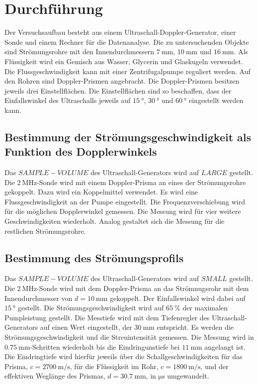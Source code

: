 \section{Durchführung}
\label{sec:Durchführung}
Der Versuchsaufbau besteht aus einem Ultraschall-Doppler-Generator, einer Sonde und einem Rechner für die Datenanalyse.
Die zu untersuchenden Objekte sind Strömungsrohre mit den Innendurchmessern $\SI{7}{\milli\meter}$, $\SI{10}{\milli\meter}$ und $\SI{16}{\milli\meter}$.
Als Flüssigkeit wird ein Gemisch aus Wasser, Glycerin und Glaskugeln verwendet.
Die Flussgeschwindigkeit kann mit einer Zentrifugalpumpe reguliert werden.
Auf den Rohren sind Doppler-Prismen angebracht.
Die Doppler-Prismen besitzen jeweils drei Einstellflächen.
Die Einstellflächen sind so beschaffen, dass der Einfallswinkel des Ultraschalls jeweils auf $\SI{15}{\degree}$, $\SI{30}{\degree}$ und $\SI{60}{\degree}$ eingestellt werden kann.
\subsection{Bestimmung der Strömungsgeschwindigkeit als Funktion des Dopplerwinkels}
Das $SAMPLE-VOLUME$ des Ultraschall-Generators wird auf $LARGE$ gestellt.
Die $\SI{2}{\mega\hertz}$-Sonde wird mit einem Doppler-Prisma an eines der Strömungsrohre gekoppelt.
Dazu wird ein Koppelmittel verwendet.
Es wird eine Flussgeschwindigkeit an der Pumpe eingestellt.
Die Frequenzverschiebung wird für die möglichen Dopplerwinkel gemessen.
Die Messung wird für vier weitere Geschwindigkeiten wiederholt.
Analog gestaltet sich die Messung für die restlichen Strömungsrohre.
\subsection{Bestimmung des Strömungsprofils}
Das $SAMPLE-VOLUME$ des Ultraschall-Generators wird auf $SMALL$ gestellt.
Die $\SI{2}{\mega\hertz}$-Sonde wird mit dem Doppler-Prisma an das Strömnugsrohr mit dem Innendurchmesser von $d= \SI{10}{\milli\meter}$ gekoppelt.
Der Einfallswinkel wird dabei auf $\SI{15}{\degree}$ gestellt.
Die Strömungsgeschwindigkeit wird auf $\SI{65}{\percent}$ der maximalen Pumpleistung gestellt.
Die Messtiefe wird mit dem Tiefenregler des Ultraschall-Generators auf einen Wert eingestellt, der $\SI{30}{\milli\meter}$ entspricht.
Es werden die Strömungsgeschwindigkeit und die Streuintensität gemessen.
Die Messung wird in $\SI{0.75}{\milli\meter}$-Schritten wiederholt bis die Eindringunstiefe bei $\SI{11}{\milli\meter}$ angelangt ist.
Die Eindringtiefe wird hierfür jeweils über die Schallgeschwindigkeiten für das Prisma,
$c=\SI{2700}{\meter\per\second}$\cite{us3}, für die Flüssigkeit im Rohr,
$c=\SI{1800}{\meter\per\second}$\cite{us3}, und der effektiven Weglänge des Prismas, $d=\SI{30.7}{\milli\meter}$,
in $\si{\micro\second}$ umgewandelt.
